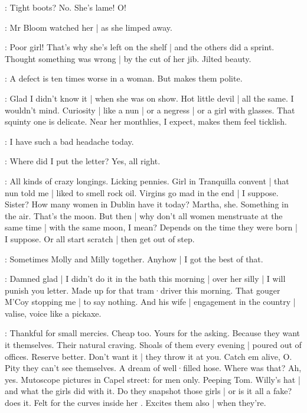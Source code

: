 \BloomInt:
Tight boots?
No.
She's lame!
O!

:
Mr Bloom watched her |
as she limped away.

\BloomCurrent:
Poor girl!
That's why
she's left on the shelf |
and the others did a sprint.
Thought something was wrong |
by the cut of her jib.
Jilted beauty.

\BloomAbstract:
A defect is ten times worse in a woman.
But makes them polite.

\BloomCurrent:
Glad I didn't know it |
when she was on show.
Hot little devil |
all the same.
I wouldn't mind.
Curiosity |
like a nun |
or a negress |
or a girl with glasses.
That squinty one is delicate.
Near her monthlies,
I expect,
makes them feel ticklish.

\BloomOther:
I have such a bad headache today.

\BloomToday:
Where did I put the letter?
Yes,
all right.

\BloomAbstract:
All kinds of crazy longings.
Licking pennies.%
Girl in Tranquilla convent |
that nun told me |
liked to smell rock oil.
Virgins go mad in the end |
I suppose.
Sister?
How many women in Dublin have it today?
Martha,
she.
Something in the air.
That's the moon.
But then |
why don't all women menstruate
at the same time |
with the same moon,
I mean?
Depends on the time they were born |
I suppose.
Or all start scratch |
then get out of step.

\BloomHist:
Sometimes Molly and Milly together.
Anyhow |
I got the best of that.

\BloomToday:
Damned glad |
I didn't do it in the bath this morning |
over her silly |
I will punish you letter.
Made up for that tram·driver this morning.
That gouger M'Coy stopping me |
to say nothing.
And his wife |
engagement in the country |
valise,
voice like a pickaxe.

\BloomAbstract:
Thankful for small mercies.
Cheap too.
Yours for the asking.%
Because they want it themselves.
Their natural craving.
Shoals of them every evening |
poured out of offices.
Reserve better.
Don't want it |
they throw it at you.
Catch em alive,
O.
Pity they can't see themselves.
A dream of well·filled hose.
Where was that?
Ah,
yes.
Mutoscope pictures in Capel street:
for men only.
Peeping Tom.
Willy's hat |
and what the girls did with it.
Do they snapshot those girls |
or is it all a fake?
 does it.
Felt for the curves inside her .
Excites them also |
when they're.


